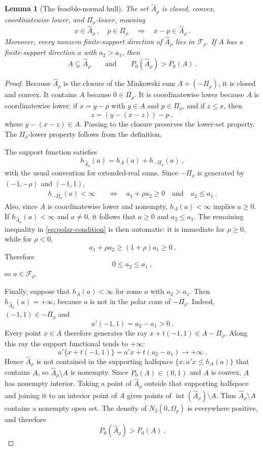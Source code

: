 \documentclass[12pt]{article}
\newtheorem{lemma}{Lemma}
\theoremstyle{remark}
\begin{document}
\begin{lemma}[The feasible-normal hull]\label{lem:hull}
The set $\widehat A_\rho$ is closed, convex, coordinatewise lower, and
$\Pi_\rho$-lower, meaning
\[
x\in\widehat A_\rho~,
\quad p\in\Pi_\rho
\quad\Longrightarrow\quad
x-p\in\widehat A_\rho~.
\]
Moreover, every nonzero finite-support direction of $\widehat A_\rho$ lies in
$\mathcal F_\rho$.  If $A$ has a finite-support direction $a$ with
$a_2>a_1$, then
\[
A\subsetneq\widehat A_\rho
\qquad\text{and}\qquad
P_0(\widehat A_\rho)>P_0(A)~.
\]
\end{lemma}

\begin{proof}
Because $\widehat A_\rho$ is the closure of the Minkowski sum
$A+(-\Pi_\rho)$, it is closed and convex.  It contains $A$ because
$0\in\Pi_\rho$.  It is coordinatewise lower because $A$ is coordinatewise
lower: if $x=y-p$ with $y\in A$ and $p\in\Pi_\rho$, and if $z\le x$, then
\[
z=(y-(x-z))-p~,
\]
where $y-(x-z)\in A$.  Passing to the closure preserves the lower-set
property.  The $\Pi_\rho$-lower property follows from the definition.

The support function satisfies
\[
h_{\widehat A_\rho}(a)=h_A(a)+h_{-\Pi_\rho}(a)~,
\]
with the usual convention for extended-real sums.  Since $-\Pi_\rho$ is
generated by $(-1,-\rho)$ and $(-1,1)$,
\begin{equation}\label{eq:polar-condition}
\begin{split}
h_{-\Pi_\rho}(a)<\infty
&\quad\Longleftrightarrow\quad
a_1+\rho a_2\ge0
\quad\text{and}\quad
a_2\le a_1~.
\end{split}
\end{equation}
Also, since $A$ is coordinatewise lower and nonempty, $h_A(a)<\infty$ implies
$a\ge0$.  If $h_{\widehat A_\rho}(a)<\infty$ and $a\ne0$, it follows that
$a\ge0$ and $a_2\le a_1$.  The remaining inequality in
\eqref{eq:polar-condition} is then automatic: it is immediate for $\rho\ge0$,
while for $\rho<0$,
\[
a_1+\rho a_2\ge(1+\rho)a_1\ge0~.
\]
Therefore
\[
0\le a_2\le a_1~,
\]
so $a\in\mathcal F_\rho$.

Finally, suppose that $h_A(a)<\infty$ for some $a$ with $a_2>a_1$.  Then
$h_{\widehat A_\rho}(a)=+\infty$, because $a$ is not in the polar cone of
$-\Pi_\rho$.  Indeed, $(-1,1)\in-\Pi_\rho$ and
\[
a'(-1,1)=a_2-a_1>0~.
\]
Every point $x\in A$ therefore generates the ray
$x+t(-1,1)\in A-\Pi_\rho$.  Along this ray the support functional tends to
$+\infty$:
\[
a'\{x+t(-1,1)\}=a'x+t(a_2-a_1)\longrightarrow+\infty~.
\]
Hence $\widehat A_\rho$ is not contained in the supporting halfspace
$\{x:a'x\le h_A(a)\}$ that contains $A$, so
$\widehat A_\rho\setminus A$ is nonempty.  Since $P_0(A)\in(0,1)$ and $A$ is
convex, $A$ has nonempty interior.  Taking a point of $\widehat A_\rho$ outside
that supporting halfspace and joining it to an interior point of $A$ gives
points of $\operatorname{int}(\widehat A_\rho)\setminus A$.  Thus
$\widehat A_\rho\setminus A$ contains a nonempty open set.  The density of
$N_2(0,\Omega_\rho)$ is everywhere positive, and therefore
\[
P_0(\widehat A_\rho)>P_0(A)~.
\]
\end{proof}
\end{document}
